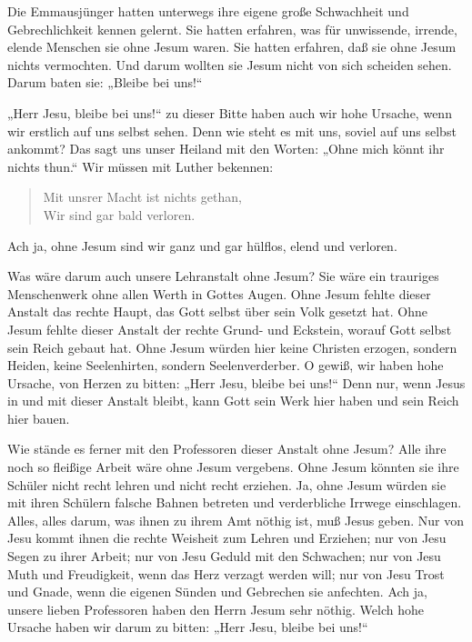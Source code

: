 Die Emmausjünger hatten unterwegs ihre eigene große Schwachheit und Gebrechlichkeit kennen gelernt. Sie hatten erfahren, was für unwissende, irrende, elende Menschen sie ohne Jesum waren. Sie hatten erfahren, daß sie ohne Jesum nichts vermochten. Und darum wollten sie Jesum nicht von sich scheiden sehen. Darum baten sie: „Bleibe bei uns!“

„Herr Jesu, bleibe bei uns!“ zu dieser Bitte haben auch wir hohe Ursache, wenn wir erstlich auf uns selbst sehen. Denn wie steht es mit uns, soviel auf uns selbst ankommt? Das sagt uns unser Heiland mit den Worten: „Ohne mich könnt ihr nichts thun.“ Wir müssen mit Luther bekennen:

\begin{verse}
Mit unsrer Macht ist nichts gethan,\\
Wir sind gar bald verloren.
\end{verse}

Ach ja, ohne Jesum sind wir ganz und gar hülflos, elend und verloren.

Was wäre darum auch unsere Lehranstalt ohne Jesum? Sie wäre ein trauriges Menschenwerk ohne allen Werth in Gottes Augen. Ohne Jesum fehlte dieser Anstalt das rechte Haupt, das Gott selbst über sein Volk gesetzt hat. Ohne Jesum fehlte dieser Anstalt der rechte Grund- und Eckstein, worauf Gott selbst sein Reich gebaut hat. Ohne Jesum würden hier keine Christen erzogen, sondern Heiden, keine Seelenhirten, sondern Seelenverderber. O gewiß, wir haben hohe Ursache, von Herzen zu bitten: „Herr Jesu, bleibe bei uns!“ Denn nur, wenn Jesus in und mit dieser Anstalt bleibt, kann Gott sein Werk hier haben und sein Reich hier bauen.

Wie stände es ferner mit den Professoren dieser Anstalt ohne Jesum? Alle ihre noch so fleißige Arbeit wäre ohne Jesum vergebens. Ohne Jesum könnten sie ihre Schüler nicht recht lehren und nicht recht erziehen. Ja, ohne Jesum würden sie mit ihren Schülern falsche Bahnen betreten und verderbliche Irrwege einschlagen. Alles, alles darum, was ihnen zu ihrem Amt nöthig ist, muß Jesus geben. Nur von Jesu kommt ihnen die rechte Weisheit zum Lehren und Erziehen; nur von Jesu Segen zu ihrer Arbeit; nur von Jesu Geduld mit den Schwachen; nur von Jesu Muth und Freudigkeit, wenn das Herz verzagt werden will; nur von Jesu Trost und Gnade, wenn die eigenen Sünden und Gebrechen sie anfechten. Ach ja, unsere lieben Professoren haben den Herrn Jesum sehr nöthig. Welch hohe Ursache haben wir darum zu bitten: „Herr Jesu, bleibe bei uns!“

